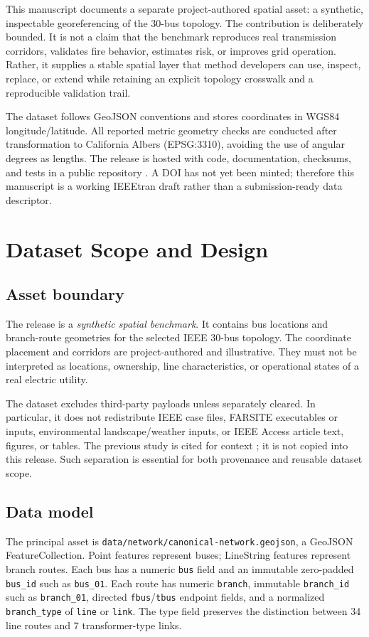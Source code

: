 \documentclass[10pt,journal]{IEEEtran}
\begin{document}
This manuscript documents a separate project-authored spatial asset: a synthetic, inspectable georeferencing of the 30-bus topology. The contribution is deliberately bounded. It is not a claim that the benchmark reproduces real transmission corridors, validates fire behavior, estimates risk, or improves grid operation. Rather, it supplies a stable spatial layer that method developers can use, inspect, replace, or extend while retaining an explicit topology crosswalk and a reproducible validation trail.

The dataset follows GeoJSON conventions \cite{rfc7946} and stores coordinates in WGS84 longitude/latitude. All reported metric geometry checks are conducted after transformation to California Albers (EPSG:3310), avoiding the use of angular degrees as lengths. The release is hosted with code, documentation, checksums, and tests in a public repository \cite{ieee30spatialrepo}. A DOI has not yet been minted; therefore this manuscript is a working IEEEtran draft rather than a submission-ready data descriptor.

\section{Dataset Scope and Design}
\subsection{Asset boundary}
The release is a \textit{synthetic spatial benchmark}. It contains bus locations and branch-route geometries for the selected IEEE 30-bus topology. The coordinate placement and corridors are project-authored and illustrative. They must not be interpreted as locations, ownership, line characteristics, or operational states of a real electric utility.

The dataset excludes third-party payloads unless separately cleared. In particular, it does not redistribute IEEE case files, FARSITE executables or inputs, environmental landscape/weather inputs, or IEEE Access article text, figures, or tables. The previous study is cited for context \cite{sohrabi2024wildfire}; it is not copied into this release. Such separation is essential for both provenance and reusable dataset scope.

\subsection{Data model}
The principal asset is \texttt{data/network/canonical-network.geojson}, a GeoJSON FeatureCollection. Point features represent buses; LineString features represent branch routes. Each bus has a numeric \texttt{bus} field and an immutable zero-padded \texttt{bus\_id} such as \texttt{bus\_01}. Each route has numeric \texttt{branch}, immutable \texttt{branch\_id} such as \texttt{branch\_01}, directed \texttt{fbus}/\texttt{tbus} endpoint fields, and a normalized \texttt{branch\_type} of \texttt{line} or \texttt{link}. The type field preserves the distinction between 34 line routes and 7 transformer-type links.
\end{document}
